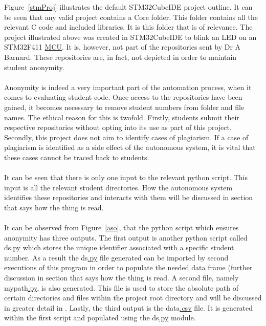 Figure~\ref{stmProj} illustrates the default STM32CubeIDE project outline. It can be seen that any valid project contains a Core folder. This folder contains all the relevant C code and included libraries. It is this folder that is of relevance. The project illustrated above was created in STM32CubeIDE to blink an LED on an STM32F411 \hyperref[listAbr]{MCU}. It is, however, not part of the repositories sent by Dr A Barnard. These repositories are, in fact, not depicted in order to maintain student anonymity. 
\\\\
Anonymity is indeed a very important part of the automation process, when it comes to evaluating student code. Once access to the repositories have been gained, it becomes necessary to remove student numbers from folder and file names. The ethical reason for this is twofold. Firstly, students submit their respective repositories without opting into its use as part of this project. Secondly, this project does not aim to identify cases of plagiarism. If a case of plagiarism is identified as a side effect of the autonomous system, it is vital that these cases cannot be traced back to students.
\\\\
It can be seen that there is only one input to the relevant python script. This input is all the relevant student directories. How the autonomous system identifies these repositories and interacts with them will be discussed in \color{green} section that says how the thing is read\color{black}.
\\\\
It can be observed from Figure~\ref{aso}, that the python script which ensures anonymity has three outputs. The first output is another python script called ds\hyperref[listExt]{.py} which stores the unique identifier associated with a specific student number. As a result the ds\hyperref[listExt]{.py} file generated can be imported by second executions of this program in order to populate the needed data frame (further discussion in \color{green} section that says how the thing is read\color{black}. A second file, namely mypath\hyperref[listExt]{.py}, is also generated. This file is used to store the absolute path of certain directories and files within the project root directory and will be discussed in greater detail in \textbf{}. Lastly, the third output is the data\hyperref[listExt]{.csv} file. It is generated within the first script and populated using the ds\hyperref[listExt]{.py} module.

